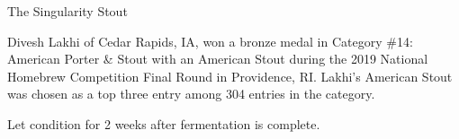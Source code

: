 \begin{recipie}{The Singularity Stout}

\begin{aboutblock}
Divesh Lakhi of Cedar Rapids, IA, won a bronze medal in Category \#14: American
Porter \& Stout with an American Stout during the 2019 National Homebrew
Competition Final Round in Providence, RI. Lakhi's American Stout was chosen as
a top three entry among 304 entries in the category. \sourceaha
\end{aboutblock}


\begin{methodandtiming}
 
\begin{mashsteps}
\end{mashsteps}

\begin{fermentationsteps}
\end{fermentationsteps}

\begin{directions}
Let condition for 2 weeks after fermentation is complete.
\end{directions}

\end{methodandtiming}

\pagebreak

\begin{ingredientsblock}

\begin{malts}
\end{malts}

\begin{hops}
\end{hops}


\end{ingredientsblock}

\end{recipie}
